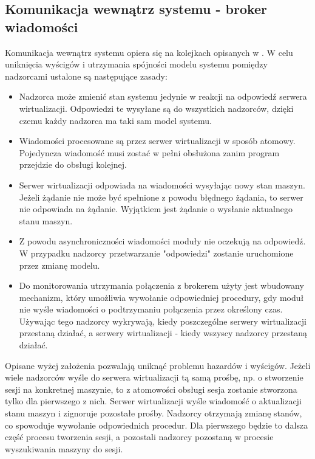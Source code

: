 \documentclass[../../deliverable-two.tex]{subfiles}
\begin{document}
\subsection{Komunikacja wewnątrz systemu - broker wiadomości}

Komunikacja wewnątrz systemu opiera się na kolejkach opisanych w . W celu uniknięcia wyścigów i utrzymania spójności modelu systemu pomiędzy nadzorcami ustalone są następujące zasady:
\begin{itemize}
    \item Nadzorca może zmienić stan systemu jedynie w reakcji na odpowiedź serwera wirtualizacji. Odpowiedzi te wysyłane są do wszystkich nadzorców, dzięki czemu każdy nadzorca ma taki sam model systemu.
    \item Wiadomości procesowane są przez serwer wirtualizacji w sposób atomowy. Pojedyncza wiadomość musi zostać w pełni obsłużona zanim program przejdzie do obsługi kolejnej.
    \item Serwer wirtualizacji odpowiada na wiadomości wysyłając nowy stan maszyn. Jeżeli żądanie nie może być spełnione z powodu błędnego żądania, to serwer nie odpowiada na żądanie. Wyjątkiem jest żądanie o wysłanie aktualnego stanu maszyn.
    \item Z powodu asynchroniczności wiadomości moduły nie oczekują na odpowiedź. W przypadku nadzorcy przetwarzanie "odpowiedzi" zostanie uruchomione przez zmianę modelu.
    \item Do monitorowania utrzymania połączenia z brokerem użyty jest wbudowany mechanizm, który umożliwia wywołanie odpowiedniej procedury, gdy moduł nie wyśle wiadomości o podtrzymaniu połączenia przez określony czas. Używając tego nadzorcy wykrywają, kiedy poszczególne serwery wirtualizacji przestaną działać, a serwery wirtualizacji - kiedy wszyscy nadzorcy przestaną działać.
\end{itemize}

Opisane wyżej założenia pozwalają uniknąć problemu hazardów i wyścigów. Jeżeli wiele nadzorców wyśle do serwera wirtualizacji tą samą prośbę, np. o stworzenie sesji na konkretnej maszynie, to z atomowości obsługi sesja zostanie stworzona tylko dla pierwszego z nich. Serwer wirtualizacji wyśle wiadomość o aktualizacji stanu maszyn i zignoruje pozostałe prośby. Nadzorcy otrzymają zmianę stanów, co spowoduje wywołanie odpowiednich procedur. Dla pierwszego będzie to dalsza część procesu tworzenia sesji, a pozostali nadzorcy pozostaną w procesie wyszukiwania maszyny do sesji.
\end{document}

